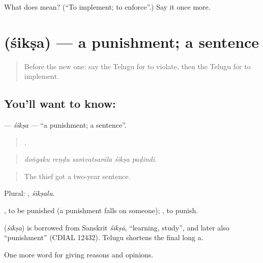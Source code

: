 \begin{tcolorbox}[breakable,colback=teal!4,colframe=teal!35!black,title={Before you move on}]
What does   mean? (\textquotedblleft{}To implement; to enforce\textquotedblright{}.) Say it once more.
\end{tcolorbox}
\section[\texorpdfstring{\te{శిక్ష} (śikṣa)}{శిక్ష (śikṣa)}]{ (śikṣa) — a punishment; a sentence}

\label{lesson:TE-C398-siksa}



\begin{quote}
Before the new one: say the Telugu for to violate, then the Telugu for to implement.
\end{quote}

\subsection*{You'll want to know: }
\textbf{} — \emph{śikṣa} — \textquotedblleft{}a punishment; a sentence\textquotedblright{}.

\begin{quote}
    .
\end{quote}

\begin{quote}
\emph{doṅgaku reṇḍu saṁvatsarāla śikṣa paḍindi.}
\end{quote}

\begin{quote}
The thief got a two-year sentence.
\end{quote}

Plural: , \emph{śikṣalu}.

 , to be punished (a punishment falls on someone); , to punish.

\begin{cousinweb}
\textbf{} (\emph{śikṣa}) is borrowed from Sanskrit \emph{śikṣā}, \textquotedblleft{}learning, study\textquotedblright{}, and later also \textquotedblleft{}punishment\textquotedblright{} (CDIAL 12432). Telugu shortens the final long a.
\end{cousinweb}

\begin{grammarlens}[title={What you've built}]
One more word for giving reasons and opinions.
\end{grammarlens}

